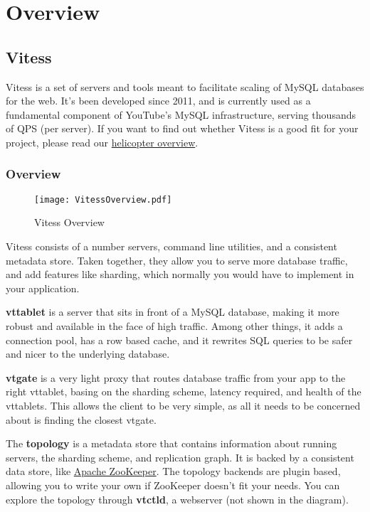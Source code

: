 \chapter{Overview}
\section{Vitess}\hypertarget{vitess}{}\label{vitess}

Vitess is a set of servers and tools meant to facilitate scaling of MySQL
databases for the web. It's been developed since 2011, and is currently used as
a fundamental component of YouTube's MySQL infrastructure, serving thousands of
QPS (per server). If you want to find out whether Vitess is a good fit for your
project, please read our \href{https://github.com/youtube/vitess/blob/master/doc/HelicopterOverview.markdown}{helicopter overview}.


\subsection{Overview}\hypertarget{overview}{}\label{overview}

\begin{figure}[H]
\caption{Vitess Overview}
\label{fig:VitessSpectrum}
\begin{center}
\texttt{[image: VitessOverview.pdf]}
\end{center}
\end{figure}


Vitess consists of a number servers, command line utilities, and a consistent
metadata store. Taken together, they allow you to serve more database traffic,
and add features like sharding, which normally you would have to implement in your
application.

\textbf{vttablet} is a server that sits in front of a MySQL database, making it more
robust and available in the face of high traffic. Among other things, it adds a
connection pool, has a row based cache, and it rewrites SQL queries to be safer
and nicer to the underlying database.

\textbf{vtgate} is a very light proxy that routes database traffic from your app to the
right vttablet, basing on the sharding scheme, latency required, and health of
the vttablets. This allows the client to be very simple, as all it needs to be
concerned about is finding the closest vtgate.

The \textbf{topology} is a metadata store that contains information about running
servers, the sharding scheme, and replication graph. It is backed by a
consistent data store, like \href{http://zookeeper.apache.org/}{Apache ZooKeeper}.
The topology backends are plugin based, allowing you to write your own if
ZooKeeper doesn't fit your needs. You can explore the topology through
\textbf{vtctld}, a webserver (not shown in the diagram).

